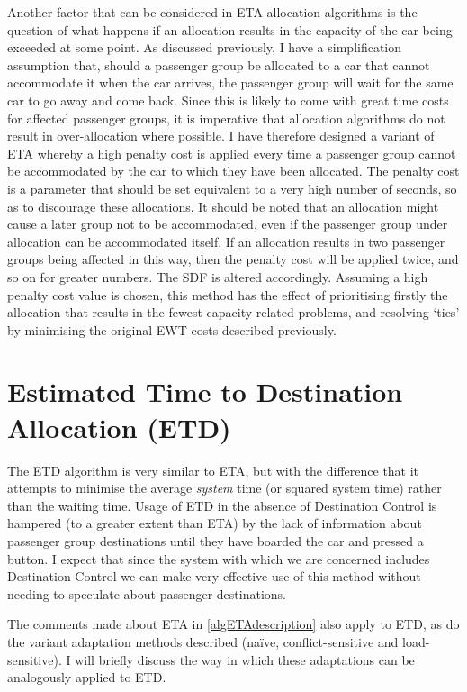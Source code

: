 \documentclass{UoYCSproject}
\begin{document}
Another factor that can be considered in ETA allocation algorithms is the question of what happens if an allocation results in the capacity of the car being exceeded at some point.  As discussed previously, I have a simplification assumption that, should a passenger group be allocated to a car that cannot accommodate it when the car arrives, the passenger group will wait for the same car to go away and come back.  Since this is likely to come with great time costs for affected passenger groups, it is imperative that allocation algorithms do not result in over-allocation where possible.  I have therefore designed a variant of ETA whereby a high penalty cost is applied every time a passenger group cannot be accommodated by the car to which they have been allocated.  The penalty cost is a parameter that should be set equivalent to a very high number of seconds, so as to discourage these allocations.  It should be noted that an allocation might cause a later group not to be accommodated, even if the passenger group under allocation can be accommodated itself.  If an allocation results in two passenger groups being affected in this way, then the penalty cost will be applied twice, and so on for greater numbers.  The SDF is altered accordingly.  Assuming a high penalty cost value is chosen, this method has the effect of prioritising firstly the allocation that results in the fewest capacity-related problems, and resolving `ties' by minimising the original EWT costs described previously.

\section{Estimated Time to Destination Allocation (ETD)}
\label{algETDdescription}

The ETD algorithm is very similar to ETA, but with the difference that it attempts to minimise the average \textit{system} time (or squared system time) rather than the waiting time.  Usage of ETD in the absence of Destination Control is hampered (to a greater extent than ETA) by the lack of information about passenger group destinations until they have boarded the car and pressed a button.  I expect that since the system with which we are concerned includes Destination Control we can make very effective use of this method without needing to speculate about passenger destinations.

The comments made about ETA in \autoref{algETAdescription} also apply to ETD, as do the variant adaptation methods described (na\"{i}ve, conflict-sensitive and load-sensitive).  I will briefly discuss the way in which these adaptations can be analogously applied to ETD.
\end{document}
